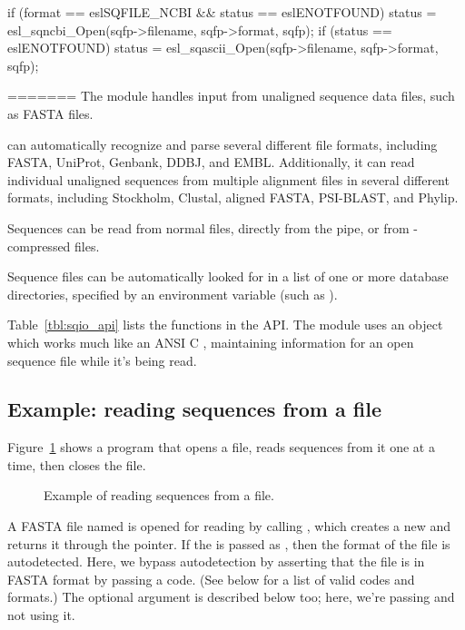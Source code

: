 \begin{cchunk}
    if (format == eslSQFILE\_NCBI && status == eslENOTFOUND)
      status = esl\_sqncbi\_Open(sqfp->filename, sqfp->format, sqfp);
    if (status == eslENOTFOUND)
      status = esl\_sqascii\_Open(sqfp->filename, sqfp->format, sqfp);
\end{cchunk}
=======
The  module handles input from unaligned sequence data
files, such as FASTA files.

 can automatically recognize and parse several different
file formats, including FASTA, UniProt, Genbank, DDBJ, and EMBL.
Additionally, it can read individual unaligned sequences from multiple
alignment files in several different formats, including Stockholm,
Clustal, aligned FASTA, PSI-BLAST, and Phylip.

Sequences can be read from normal files, directly from the
 pipe, or from -compressed files.

Sequence files can be automatically looked for in a list of one or
more database directories, specified by an environment variable (such
as ).

Table~\ref{tbl:sqio_api} lists the functions in the  API.
The module uses an  object which works much like an
ANSI C , maintaining information for an open sequence file
while it's being read.

%




\subsection{Example: reading sequences from a file}

Figure~\ref{fig:sqio_example_text} shows a program that opens a file, reads
sequences from it one at a time, then closes the file.

\begin{figure}

\caption{Example of reading sequences from a file.}
\label{fig:sqio_example_text}
\end{figure}

A FASTA file named  is opened for reading by calling
, which
creates a new  and returns it through the
 pointer. If the  is passed as
, then the format of the file is
autodetected. Here, we bypass autodetection by asserting that the file
is in FASTA format by passing a  code. (See
below for a list of valid codes and formats.) The optional 
argument is described below too; here, we're passing  and
not using it.

